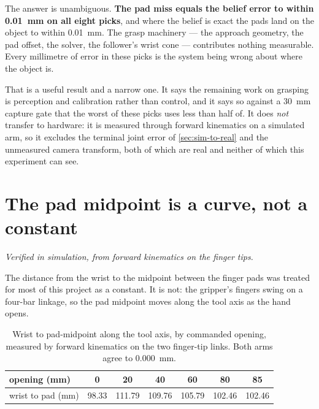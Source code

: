 The answer is unambiguous. \textbf{The pad miss equals the belief error to
within \SI{0.01}{\milli\metre} on all eight picks}, and where the belief is
exact the pads land on the object to within \SI{0.01}{\milli\metre}. The
grasp machinery --- the approach geometry, the pad offset, the solver, the
follower's wrist cone --- contributes nothing measurable. Every millimetre of
error in these picks is the system being wrong about where the object is.

That is a useful result and a narrow one. It says the remaining work on
grasping is perception and calibration rather than control, and it says so
against a \SI{30}{\milli\metre} capture gate that the worst of these picks
uses less than half of. It does \emph{not} transfer to hardware: it is
measured through forward kinematics on a simulated arm, so it excludes the
terminal joint error of \cref{sec:sim-to-real} and the unmeasured camera
transform, both of which are real and neither of which this experiment can
see.

\section{The pad midpoint is a curve, not a constant}
\label{sec:pad-curve}

\emph{Verified in simulation, from forward kinematics on the finger tips.}

The distance from the wrist to the midpoint between the finger pads was
treated for most of this project as a constant. It is not: the gripper's
fingers swing on a four-bar linkage, so the pad midpoint moves along the tool
axis as the hand opens.

\begin{table}[htbp]
  \centering
  \small
  \caption[Wrist-to-pad against gripper opening]{Wrist to pad-midpoint along
  the tool axis, by commanded opening, measured by forward kinematics on the
  two finger-tip links. Both arms agree to \SI{0.000}{\milli\metre}.}
  \label{tab:pad-curve}
  \begin{tabular}{@{}lcccccc@{}}
    \toprule
    opening (\si{\milli\metre}) & 0 & 20 & 40 & 60 & 80 & 85 \\
    \midrule
    wrist to pad (\si{\milli\metre})
      & \num{98.33} & \num{111.79} & \num{109.76}
      & \num{105.79} & \num{102.46} & \num{102.46} \\
    \bottomrule
  \end{tabular}
\end{table}

